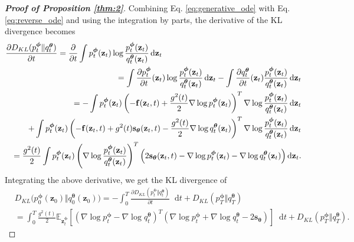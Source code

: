\documentclass{article}
\theoremstyle{definition}
\theoremstyle{remark}
\newcommand*\diff{\mathop{}\!\mathrm{d}}
\begin{document}
\begin{proof}[\textbf{Proof of Proposition \ref{thm:2}}]
		Combining Eq. \eqref{eq:generative_ode} with Eq. \eqref{eq:reverse_ode} and using the integration by parts, the derivative of the KL divergence becomes
		\begin{eqnarray*}
			\lefteqn{\frac{\partial D_{KL}(p_{t}^{\bm{\phi}}\Vert q_{t}^{\bm{\theta}})}{\partial t}=\frac{\partial}{\partial t}\int p_{t}^{\bm{\phi}}(\mathbf{z}_{t})\log{\frac{p_{t}^{\bm{\phi}}(\mathbf{z}_{t})}{q_{t}^{\bm{\theta}}(\mathbf{z}_{t})}}\diff \mathbf{z}_{t}}&\\
			&&=\int \frac{\partial p_{t}^{\bm{\phi}}}{\partial t}(\mathbf{z}_{t})\log{\frac{p_{t}^{\bm{\phi}}(\mathbf{z}_{t})}{q_{t}^{\bm{\theta}}(\mathbf{z}_{t})}}\diff \mathbf{z}_{t}-\int \frac{\partial q_{t}^{\bm{\theta}}}{\partial t}(\mathbf{z}_{t})\frac{p_{t}^{\bm{\phi}}(\mathbf{z}_{t})}{q_{t}^{\bm{\theta}}(\mathbf{z}_{t})}\diff\mathbf{z}_{t}\\
			&&=-\int p_{t}^{\bm{\phi}}(\mathbf{z}_{t})\left(-\mathbf{f}(\mathbf{z}_{t},t)+\frac{g^{2}(t)}{2}\nabla \log{p_{t}^{\bm{\phi}}(\mathbf{z}_{t})}\right)^{T}\nabla\log{\frac{p_{t}^{\bm{\phi}}(\mathbf{z}_{t})}{q_{t}^{\bm{\theta}}(\mathbf{z}_{t})}}\diff\mathbf{z}_{t}\\
			&&\quad+\int p_{t}^{\bm{\phi}}(\mathbf{z}_{t})\left(-\mathbf{f}(\mathbf{z}_{t},t)+g^{2}(t)\mathbf{s}_{\bm{\theta}}(\mathbf{z}_{t},t)-\frac{g^{2}(t)}{2}\nabla \log{q_{t}^{\bm{\theta}}(\mathbf{z}_{t})}\right)^{T}\nabla\log{\frac{p_{t}^{\bm{\phi}}(\mathbf{z}_{t})}{q_{t}^{\bm{\theta}}(\mathbf{z}_{t})}}\diff\mathbf{z}_{t}\\
			&&=\frac{g^{2}(t)}{2}\int p_{t}^{\bm{\phi}}(\mathbf{z}_{t})\left(\nabla\log{\frac{p_{t}^{\bm{\phi}}(\mathbf{z}_{t})}{q_{t}^{\bm{\theta}}(\mathbf{z}_{t})}}\right)^{T}\left(2\mathbf{s}_{\bm{\theta}}(\mathbf{z}_{t},t)-\nabla\log{p_{t}^{\bm{\phi}}(\mathbf{z}_{t})}-\nabla\log{q_{t}^{\bm{\theta}}(\mathbf{z}_{t})}\right)\diff\mathbf{z}_{t}.
		\end{eqnarray*}
		Integrating the above derivative, we get the KL divergence of
		\begin{align}
		&D_{KL}\big(p_{0}^{\bm{\phi}}(\mathbf{z}_{0})\Vert q_{0}^{\bm{\theta}}(\mathbf{z}_{0})\big)=-\int_{0}^{T} \frac{\partial D_{KL}(p_{t}^{\bm{\phi}}\Vert q_{t}^{\bm{\theta}})}{\partial t}\diff t+D_{KL}(p_{T}^{\bm{\phi}}\Vert q_{T}^{\bm{\theta}})\label{eq:indm_kl}\\
		&=\int_{0}^{T}\frac{g^{2}(t)}{2}\mathbb{E}_{\mathbf{z}_{t}^{\bm{\phi}}}\left[ (\nabla\log{p_{t}^{\bm{\phi}}}-\nabla\log{q_{t}^{\bm{\theta}}})^{T}(\nabla\log{p_{t}^{\bm{\phi}}}+\nabla\log{q_{t}^{\bm{\theta}}}-2\mathbf{s}_{\bm{\theta}}) \right]\diff t+D_{KL}(p_{T}^{\bm{\phi}}\Vert q_{T}^{\bm{\theta}}).\nonumber
		\end{align}
		

\end{proof}
\end{document}
